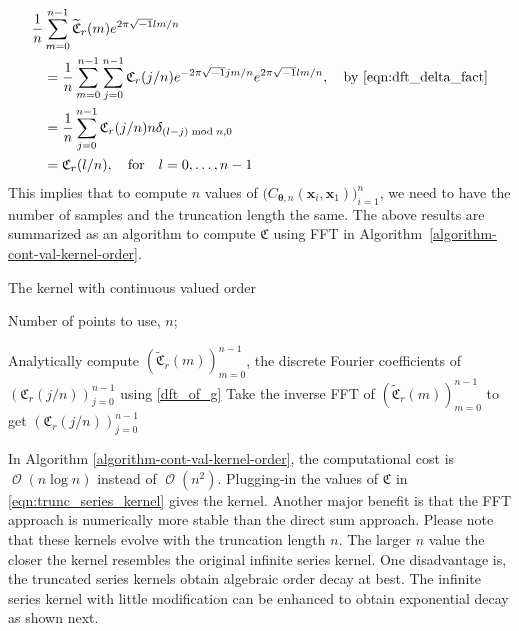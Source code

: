\documentclass{iitthesis}          %
\DeclareMathOperator{\Order}{{\mathcal O}}
\newcommand{\bm}[1]{\boldsymbol{#1}}
\newcommand{\vtheta}{{\bm{\theta}}}
\newcommand{\vx}{\bm{x}}
\begin{document}
\begin{align*}
\frac{1}{n} &\sum_{m=0}^{n-1} \widetilde{\mathfrak{C}}_{r} (m) e^{2 \pi\sqrt{-1} lm/n} \\
& = \frac{1}{n} \sum_{m=0}^{n-1} 
\sum_{j=0}^{n-1} \mathfrak{C}_{r} (j/n) e^{- 2 \pi\sqrt{-1} jm/n}
e^{2 \pi\sqrt{-1} lm/n}, \quad \text{by \eqref{eqn:dft_delta_fact}}  \\
& = \frac{1}{n}  \sum_{j=0}^{n-1} \mathfrak{C}_{r} (j/n) n \delta_{(l-j) \bmod n, 0} \\
& = \mathfrak{C}_{r} (l/n), \quad \text{for} \quad l=0,\dots,n-1
\end{align*}
This implies that to compute $n$ values of $\biggl( C_{\vtheta, n}(\vx_i, \vx_1) \biggr)_{i=1}^n$, we need to have the number of samples and the truncation length the same. 
The above results are summarized as an algorithm to compute $\mathfrak{C}$ using FFT in Algorithm~\ref{algorithm-cont-val-kernel-order}.
\begin{algorithm}
	\caption{The kernel with continuous valued order}\label{algorithm-cont-val-kernel-order}
	\begin{algorithmic}[1]
	
	\Require
	Number of points to use, $n$; 

	\State Analytically compute $\left(\widetilde{\mathfrak{C}}_{r}(m)\right)_{m=0}^{n-1}$, the discrete Fourier coefficients of $\left(\mathfrak{C}_r(j/n)\right)_{j=0}^{n-1}$ using \eqref{dft_of_g}
	\State Take the inverse FFT of $\left(\widetilde{\mathfrak{C}}_{r}(m)\right)_{m=0}^{n-1}$ to get $\left(\mathfrak{C}_r(j/n)\right)_{j=0}^{n-1}$
	\end{algorithmic}

\end{algorithm}

In Algorithm \ref{algorithm-cont-val-kernel-order}, the computational cost is $\Order(n \log n)$ instead of $\Order(n^2)$. Plugging-in the values of $\mathfrak{C}$ in \eqref{eqn:trunc_series_kernel} gives the kernel. Another major benefit is that the FFT approach is numerically more stable than the direct sum approach. Please note that these kernels evolve with the truncation length $n$. The larger $n$ value the closer the kernel resembles the original infinite series kernel. One disadvantage is, the truncated series kernels obtain algebraic order decay at best. The infinite series kernel with little modification can be enhanced to obtain exponential decay as shown next.
\end{document}
